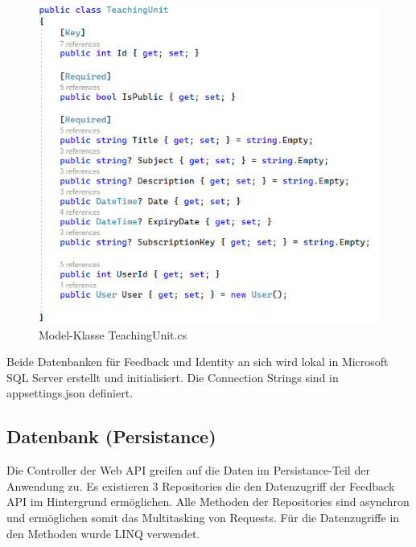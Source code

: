 \begin{figure}[h]
    \begin{center}
        \includegraphics[width=12cm]{./pics/Persistance/TeachingUnitModelEfCore.png}
    \caption[TeachingUnitModel]{Model-Klasse TeachingUnit.cs}
    \end{center}
\end{figure}

Beide Datenbanken für Feedback und Identity an sich wird lokal in Microsoft SQL Server erstellt und initialisiert. 
Die Connection Strings sind in appsettings.json definiert.

\newpage
\subsection{Datenbank (Persistance)}
\author{Stefano Pyringer}
Die Controller der Web API greifen auf die Daten im Persistance-Teil der Anwendung zu. Es existieren 3 Repositories 
die den Datenzugriff der Feedback API im Hintergrund ermöglichen. Alle Methoden der Repositories sind asynchron und 
ermöglichen somit das Multitasking von Requests. Für die Datenzugriffe in den Methoden wurde LINQ verwendet.


